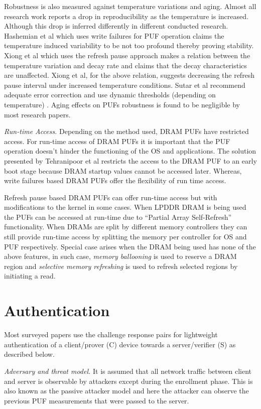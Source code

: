 \documentclass[journal, a4paper]{IEEEtran}
\begin{document}
Robustness is also measured against temperature variations and aging. Almost all research work reports a drop in reproducibility as the temperature is increased. Although this drop is inferred differently in different conducted research. Hashemian et al which uses write failures for PUF operation claims the temperature induced variability to be not too profound thereby proving stability. Xiong et al which uses the refresh pause approach makes a relation between the temperature variation and decay rate and claims that the decay characteristics are unaffected. Xiong et al, for the above relation, suggests decreasing the refresh pause interval under increased temperature conditions. Sutar et al recommend adequate error correction and use dynamic thresholds (depending on temperature) . Aging effects on PUFs robustness is found to be negligible by most research papers.

\textit{Run-time Access.} Depending on the method used, DRAM PUFs have restricted access. For run-time access of DRAM PUFs it is important that the PUF operation doesn’t hinder the functioning of the OS and applications. The solution presented by Tehranipoor et al restricts the access to the DRAM PUF to an early boot stage because DRAM startup values cannot be accessed later. Whereas, write failures based DRAM PUFs offer the flexibility of run time access.

Refresh pause based  DRAM PUFs can offer run-time access but with modifications to the kernel in some cases. When LPDDR DRAM is being used the PUFs can be accessed at run-time due to “Partial Array Self-Refresh” functionality. \cite{SUT18} When DRAMs are split by different memory controllers they can still provide run-time access by splitting the memory per controller for OS and PUF respectively. Special case arises when the DRAM being used has none of the above features, in such case, \textit{memory ballooning} is used to reserve a DRAM region and \textit{selective memory refreshing} is used to refresh selected regions by initiating a read.\cite{XIO16}

\section{Authentication}
Most surveyed papers use the challenge response pairs for lightweight authentication of a client/prover (C) device towards a server/verifier (S) as described below.

\textit{Adversary and threat model.} It is assumed that all network traffic between client and server is observable by attackers except during the enrollment phase. This is also known as the passive attacker model and here the attacker can observe the previous PUF measurements that were passed to the server.
\end{document}

